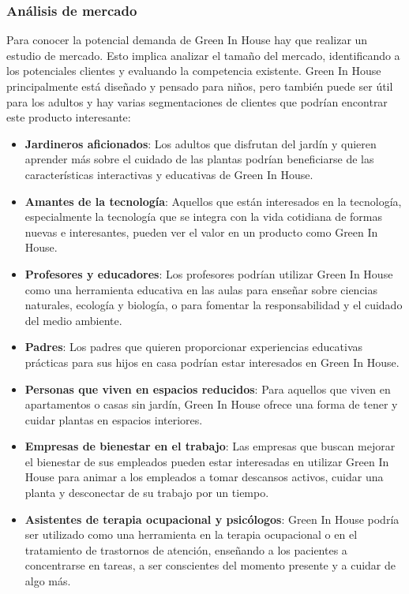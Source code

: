         \subsubsection{Análisis de mercado}
        Para conocer la potencial demanda de Green In House hay que realizar un estudio de mercado. Esto implica analizar el tamaño del mercado, identificando a los potenciales clientes y evaluando la competencia existente.
            Green In House principalmente está diseñado y pensado para niños, pero también puede ser útil para los adultos y hay varias segmentaciones de clientes que podrían encontrar este producto interesante:
            \begin{itemize}      
                \item \textbf{Jardineros aficionados}: Los adultos que disfrutan del jardín y quieren aprender más sobre el cuidado de las plantas podrían beneficiarse de las características interactivas y educativas de Green In House.
                \item \textbf{Amantes de la tecnología}: Aquellos que están interesados en la tecnología, especialmente la tecnología que se integra con la vida cotidiana de formas nuevas e interesantes, pueden ver el valor en un producto como Green In House.
                \item \textbf{Profesores y educadores}: Los profesores podrían utilizar Green In House como una herramienta educativa en las aulas para enseñar sobre ciencias naturales, ecología y biología, o para fomentar la responsabilidad y el cuidado del medio ambiente.
                \item \textbf{Padres}: Los padres que quieren proporcionar experiencias educativas prácticas para sus hijos en casa podrían estar interesados en Green In House.
                \item \textbf{Personas que viven en espacios reducidos}: Para aquellos que viven en apartamentos o casas sin jardín, Green In House ofrece una forma de tener y cuidar plantas en espacios interiores.
                \item \textbf{Empresas de bienestar en el trabajo}: Las empresas que buscan mejorar el bienestar de sus empleados pueden estar interesadas en utilizar Green In House para animar a los empleados a tomar descansos activos, cuidar una planta y desconectar de su trabajo por un tiempo.
                \item \textbf{Asistentes de terapia ocupacional y psicólogos}: Green In House podría ser utilizado como una herramienta en la terapia ocupacional o en el tratamiento de trastornos de atención, enseñando a los pacientes a concentrarse en tareas, a ser conscientes del momento presente y a cuidar de algo más.
            \end{itemize}
